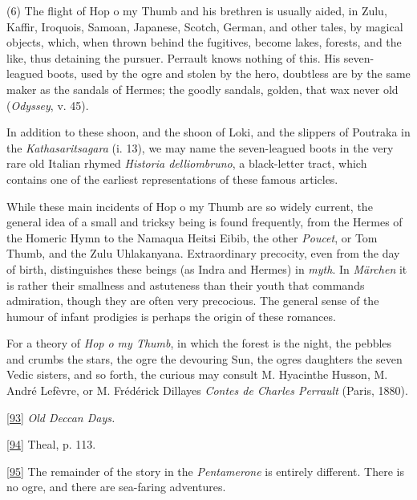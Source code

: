 \documentclass[14pt,a4paper]{memoir}
\begin{document}
(6) The flight of Hop o\textquotesingle{} my Thumb and his brethren is
usually aided, in Zulu, Kaffir, Iroquois, Samoan, Japanese, Scotch,
German, and other tales, by magical objects, which, when thrown behind
the fugitives, become lakes, forests, and the like, thus detaining the
pursuer. Perrault knows nothing of this. His seven-leagued boots, used
by the ogre and stolen by the hero, doubtless are by the same maker as
the sandals of Hermes; the goodly sandals, golden, that wax never old
(\emph{Odyssey}, v. 45).

In addition to these shoon, and the shoon of Loki, and the slippers of
Poutraka in the \emph{Kathasaritsagara} (i. 13), we may name the
seven-leagued boots in the very rare old Italian rhymed \emph{Historia
delliombruno}, a black-letter tract, which contains one of the earliest
representations of these famous articles.

While these main incidents of Hop o\textquotesingle{} my Thumb are so
widely current, the general idea of a small and tricksy being is found
frequently, from the Hermes of the Homeric Hymn to the Namaqua Heitsi
Eibib, the other \emph{Poucet}, or Tom Thumb, and the Zulu Uhlakanyana.
Extraordinary precocity, even from the day of birth, distinguishes these
beings (as Indra and Hermes) in \emph{myth}. In \emph{Märchen} it is
rather their smallness and astuteness than their youth that commands
admiration, though they are often very precocious. The general sense of
the humour of \textquotesingle infant prodigies\textquotesingle{} is
perhaps the origin of these romances.

For a theory of \emph{Hop o\textquotesingle{} my Thumb}, in which the
forest is the night, the pebbles and crumbs the stars, the ogre the
devouring Sun, the ogre\textquotesingle s daughters \textquotesingle the
seven Vedic sisters,\textquotesingle{} and so forth, the curious may
consult M. Hyacinthe Husson, M. André Lefèvre, or M. Frédérick
Dillaye\textquotesingle s \emph{Contes de Charles Perrault} (Paris,
1880).

\protect\hypertarget{4533318093929944247_33931-h-1.htm.xhtmlux5cux23Footnote_93}{}{}\protect\hyperlink{4533318093929944247_33931-h-1.htm.xhtmlux5cux23FNanchor_93}{{{[}93{]}}}
\emph{Old Deccan Days.}

\protect\hypertarget{4533318093929944247_33931-h-1.htm.xhtmlux5cux23Footnote_94}{}{}\protect\hyperlink{4533318093929944247_33931-h-1.htm.xhtmlux5cux23FNanchor_94}{{{[}94{]}}}
Theal, p. 113.

\protect\hypertarget{4533318093929944247_33931-h-1.htm.xhtmlux5cux23Footnote_95}{}{}\protect\hyperlink{4533318093929944247_33931-h-1.htm.xhtmlux5cux23FNanchor_95}{{{[}95{]}}}
The remainder of the story in the \emph{Pentamerone} is entirely
different. There is no ogre, and there are sea-faring adventures.
\end{document}
